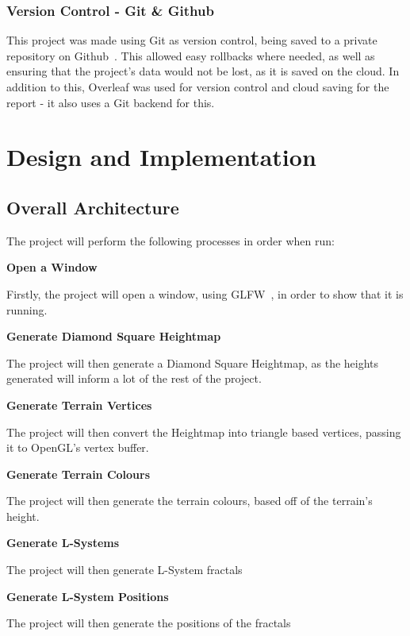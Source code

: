 \documentclass[a4paper,10pt]{report}
\begin{document}
\subsection{Version Control - Git \& Github}
This project was made using Git as version control, being saved to a private repository on Github~\cite{github}. This allowed easy rollbacks where needed, as well as ensuring that the project's data would not be lost, as it is saved on the cloud. In addition to this, Overleaf was used for version control and cloud saving for the report - it also uses a Git backend for this.


\chapter{Design and Implementation}

\section{Overall Architecture}

The project will perform the following processes in order when run: \bigskip

\textbf{Open a Window} \par
Firstly, the project will open a window, using GLFW~\cite{berglund2006glfw}, in order to show that it is running. \medskip

\textbf{Generate Diamond Square Heightmap} \par
The project will then generate a Diamond Square Heightmap, as the heights generated will inform a lot of the rest of the project. \medskip

\textbf{Generate Terrain Vertices} \par
The project will then convert the Heightmap into triangle based vertices, passing it to OpenGL's vertex buffer. \medskip

\textbf{Generate Terrain Colours} \par
The project will then generate the terrain colours, based off of the terrain's height. \medskip

\textbf{Generate L-Systems} \par
The project will then generate L-System fractals \medskip

\textbf{Generate L-System Positions} \par 
The project will then generate the positions of the fractals \medskip
\end{document}
